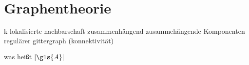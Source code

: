 \section{Graphentheorie}
\label{graphentheorie}

k lokalisierte nachbarschaft
zusammenhängend
zusammehängende Komponenten
regulärer gittergraph (konnektivität)

was heißt $\left|\gls{A}\right|$
